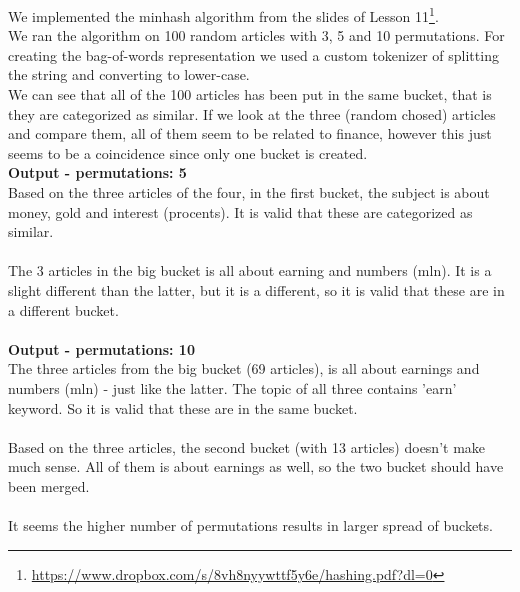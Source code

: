 \documentclass{article}
\begin{document}
We implemented the minhash algorithm from the slides of Lesson 11\footnote{\url{https://www.dropbox.com/s/8vh8nyywttf5y6e/hashing.pdf?dl=0}}.\\
We ran the algorithm on 100 random articles with 3, 5 and 10 permutations. For creating the bag-of-words representation we used a custom tokenizer of splitting the string and converting to lower-case.\\
We can see that all of the 100 articles has been put in the same bucket, that is they are categorized as similar. If we look at the three (random chosed) articles and compare them, all of them seem to be related to finance, however this just seems to be a coincidence since only one bucket is created.~\\
\textbf{Output - permutations: 5}\\
Based on the three articles of the four, in the first bucket, the subject is about money, gold and interest (procents). It is valid that these are categorized as similar. \\
~\\
The 3 articles in the big bucket is all about earning and numbers (mln). It is a slight different than the latter, but it is a different, so it is valid that these are in a different bucket. \\
~\\
\textbf{Output - permutations: 10}\\
The three articles from the big bucket (69 articles), is all about earnings and numbers (mln) - just like the latter. The topic of all three contains 'earn' keyword. So it is valid that these are in the same bucket. \\
~\\
Based on the three articles, the second bucket (with 13 articles) doesn't make much sense. All of them is about earnings as well, so the two bucket should have been merged. \\
~\\

It seems the higher number of permutations results in larger spread of buckets.
\end{document}
